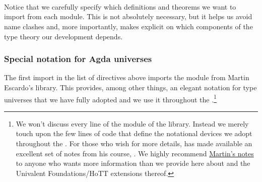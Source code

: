 \begin{code}
\<%
\\
%
\>[0]\AgdaSpace{}%
\AgdaSpace{}%
\AgdaSpace{}%
\AgdaSpace{}%
\AgdaSymbol{(}\AgdaSymbol{;}\AgdaSpace{}%
\AgdaSymbol{)}\AgdaSpace{}%
\<%
\\
%
\>[0]\AgdaSpace{}%
\AgdaSpace{}%
\AgdaSpace{}%
\AgdaSpace{}%
\AgdaSymbol{(}\AgdaSymbol{;}\AgdaSpace{}%
\AgdaSymbol{;}\AgdaSpace{}%
\AgdaSymbol{;}\<%
\\
\>[0][@{}l@{\AgdaIndent{0}}]%
\>[1]\AgdaSymbol{;}\AgdaSpace{}%
\AgdaSymbol{;}\AgdaSpace{}%
\AgdaSymbol{;}\AgdaSpace{}%
\AgdaSymbol{)}\AgdaSpace{}%
\<%
\end{code}
\ccpad
Notice that we carefully specify which definitions and theorems we want to import from each module. This is not absolutely necessary, but it helps us avoid name clashes and, more importantly, makes explicit on which components of the type theory our development depends.

\subsubsection{Special notation for Agda universes}
\label{special-notation-for-agda-universes}
The first import in the list of \AgdaSpace{} directives above imports the \universes module from Martin Escardo's \TypeTopology library. This provides, among other things, an elegant notation for type universes that we have fully adopted and we use it throughout the \agdaualib.\footnote{We won't discuss every line of the \universes module of the \typetopology library. Instead we merely touch upon the few lines of code that define the notational devices we adopt throughout the \ualib. For those who wish for more details, \mhe has made available an excellent set of notes from his course, \MGSnineteen. We highly recommend \href{https://www.cs.bham.ac.uk/~mhe/HoTT-UF-in-Agda-Lecture-Notes/index.html}{Martin's notes} to anyone who wants more information than we provide here about \MLTT and the Univalent Foundations/HoTT extensions thereof.}



